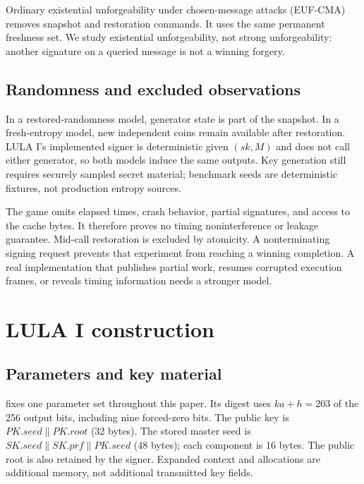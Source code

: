\documentclass[a4paper,envcountsame,runningheads]{llncs}
\begin{document}
Ordinary existential unforgeability under chosen-message attacks (EUF-CMA) removes snapshot and restoration commands. It uses the same permanent freshness set. We study existential unforgeability, not strong unforgeability: another signature on a queried message is not a winning forgery.

\subsection{Randomness and excluded observations}
In a restored-randomness model, generator state is part of the snapshot. In a fresh-entropy model, new independent coins remain available after restoration. LULA I's implemented signer is deterministic given $(sk,M)$ and does not call either generator, so both models induce the same outputs. Key generation still requires securely sampled secret material; benchmark seeds are deterministic fixtures, not production entropy sources.

The game omits elapsed times, crash behavior, partial signatures, and access to the cache bytes. It therefore proves no timing noninterference or leakage guarantee. Mid-call restoration is excluded by atomicity. A nonterminating signing request prevents that experiment from reaching a winning completion. A real implementation that publishes partial work, resumes corrupted execution frames, or reveals timing information needs a stronger model.

\section{LULA I construction}\label{sec:construction}
\subsection{Parameters and key material}
 fixes one parameter set throughout this paper. Its digest uses $ka+h=203$ of the 256 output bits, including nine forced-zero bits. The public key is $PK.seed\|PK.root$ (32 bytes). The stored master seed is $SK.seed\|SK.prf\|PK.seed$ (48 bytes); each component is 16 bytes. The public root is also retained by the signer. Expanded context and allocations are additional memory, not additional transmitted key fields.
\end{document}
